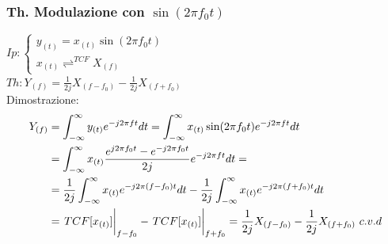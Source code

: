         \subsubsection{Th. Modulazione con $\sin(2\pi f_0t)$}\label{Modulazione con seno}
        $Ip:\begin{cases}
                y_{(t)}= x_{(t)}\sin(2\pi f_0t)\\        
                x_{(t)}\rightleftharpoons^{TCF} X_{(f)}
            \end{cases}$\\
        $Th: Y_{(f)} = \frac{1}{2j} X_{(f-f_0)} - \frac{1}{2j} X_{(f+f_0)} $ \\
        Dimostrazione: 
        \begin{align}
            Y_{(f)} & = \int_{-\infty}^{\infty} y_{(t)} e^{-j2\pi ft} dt = \int_{-\infty}^{\infty} x_{(t)}\sin(2\pi f_0t) e^{-j2\pi ft} dt \nonumber \\
            & =\int_{-\infty}^{\infty} x_{(t)} \frac{e^{j2\pi f_0t} - e^{-j2\pi f_0t}}{2j} e^{-j2\pi ft} dt =  \nonumber \\
            & = \frac{1}{2j} \int_{-\infty}^{\infty} x_{(t)} e^{-j2\pi (f-f_0)t} dt - \frac{1}{2j} \int_{-\infty}^{\infty} x_{(t)} e^{-j2\pi (f+f_0)t} dt \nonumber \\
            & = \eval{TCF[x_{(t)}]}_{f-f_0} - \eval{TCF[x_{(t)}]}_{f+f_0} = \frac{1}{2j} X_{(f-f_0)} - \frac{1}{2j} X_{(f+f_0)}\ c.v.d \nonumber  
        \end{align}

